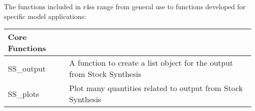 The functions included in r4ss range from general use to functions developed for specific model applications:
\begin{center}
	\begin{longtable}{p{4.5cm} p{10.52cm}}
		\hline
		Core Functions & \Tstrut\Bstrut\\
		\hline
		SS\_output \Tstrut& A function to create a list object for the output from Stock Synthesis\\
		SS\_plots  \Tstrut& Plot many quantities related to output from Stock Synthesis\\
		\hline
		
	

\end{longtable}
\end{center}
